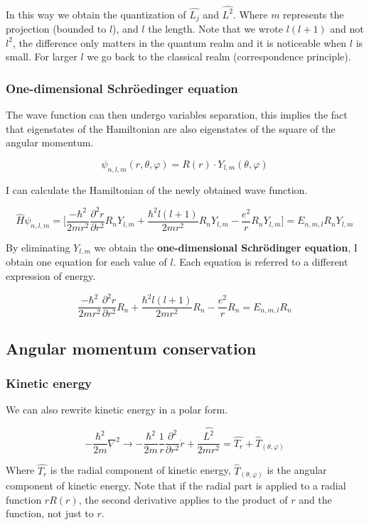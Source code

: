		In this way we obtain the quantization of $\hat{L_j}$ and $\hat{L^2}$.
		Where $m$ represents the projection (bounded to $l$), and $l$ the length.
		Note that we wrote $l(l+1)$ and not $l^2$, the difference only matters in the quantum realm and it is noticeable when $l$ is small.
		For larger $l$ we go back to the classical realm (correspondence principle).

		\subsubsection{One-dimensional Schr\"oedinger equation}
		The wave function can then undergo variables separation, this implies the fact that eigenstates of the Hamiltonian are also eigenstates of the square of the angular momentum.

		$$\psi_{n,l,m}(r,\theta,\varphi)=R(r)\cdot Y_{l,m}(\theta,\varphi)$$

		I can calculate the Hamiltonian of the newly obtained wave function.

		$$\hat{H}\psi_{n,l,m}=\bigg[\frac{-\hbar^2}{2mr^2}\frac{\partial^2r}{\partial r^2}R_nY_{l,m}+\frac{\hbar^2l(l+1)}{2mr^2}R_nY_{l,m}-\frac{e^2}{r}R_nY_{l,m}\bigg]=E_{n,m,l}R_nY_{l,m}$$

		By eliminating $Y_{l,m}$ we obtain the \textbf{one-dimensional Schr\"odinger equation}, I obtain one equation for each value of $l$.
		Each equation is referred to a different expression of energy.

		$$\frac{-\hbar^2}{2mr^2}\frac{\partial^2r}{\partial r^2}R_n+\frac{\hbar^2l(l+1)}{2mr^2}R_n-\frac{e^2}{r}R_n=E_{n,m,l}R_n$$

	\subsection{Angular momentum conservation}

		\subsubsection{Kinetic energy}
		We can also rewrite kinetic energy in a polar form.

		$$-\frac{\hbar^2}{2m}\nabla^2 \rightarrow-\frac{\hbar^2}{2m}\frac{1}{r}\frac{\partial^2}{\partial r^2}\dot{r}+\frac{\hat{L^2}}{2mr^2} = \hat{T_r}+\hat{T}_{(\theta,\varphi)}$$

		Where $\hat{T_r}$ is the radial component of kinetic energy, $\hat{T}_{(\theta,\varphi)}$ is the angular component of kinetic energy.
		Note that if the radial part is applied to a radial function $rR(r)$, the second derivative applies to the product of $r$ and the function, not just to $r$.

